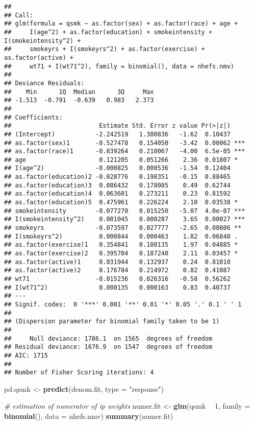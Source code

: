 \documentclass[10pt,]{book}
\newenvironment{Shaded}{\begin{snugshade}}{\end{snugshade}}
\newcommand{\CommentTok}[1]{\textcolor[rgb]{0.56,0.35,0.01}{\textit{#1}}}
\newcommand{\DataTypeTok}[1]{\textcolor[rgb]{0.13,0.29,0.53}{#1}}
\newcommand{\DecValTok}[1]{\textcolor[rgb]{0.00,0.00,0.81}{#1}}
\newcommand{\KeywordTok}[1]{\textcolor[rgb]{0.13,0.29,0.53}{\textbf{#1}}}
\newcommand{\NormalTok}[1]{#1}
\newcommand{\OperatorTok}[1]{\textcolor[rgb]{0.81,0.36,0.00}{\textbf{#1}}}
\newcommand{\StringTok}[1]{\textcolor[rgb]{0.31,0.60,0.02}{#1}}
\begin{document}
\begin{verbatim}
## 
## Call:
## glm(formula = qsmk ~ as.factor(sex) + as.factor(race) + age + 
##     I(age^2) + as.factor(education) + smokeintensity + I(smokeintensity^2) + 
##     smokeyrs + I(smokeyrs^2) + as.factor(exercise) + as.factor(active) + 
##     wt71 + I(wt71^2), family = binomial(), data = nhefs.nmv)
## 
## Deviance Residuals: 
##    Min      1Q  Median      3Q     Max  
## -1.513  -0.791  -0.639   0.983   2.373  
## 
## Coefficients:
##                        Estimate Std. Error z value Pr(>|z|)    
## (Intercept)           -2.242519   1.380836   -1.62  0.10437    
## as.factor(sex)1       -0.527478   0.154050   -3.42  0.00062 ***
## as.factor(race)1      -0.839264   0.210067   -4.00  6.5e-05 ***
## age                    0.121205   0.051266    2.36  0.01807 *  
## I(age^2)              -0.000825   0.000536   -1.54  0.12404    
## as.factor(education)2 -0.028776   0.198351   -0.15  0.88465    
## as.factor(education)3  0.086432   0.178085    0.49  0.62744    
## as.factor(education)4  0.063601   0.273211    0.23  0.81592    
## as.factor(education)5  0.475961   0.226224    2.10  0.03538 *  
## smokeintensity        -0.077270   0.015250   -5.07  4.0e-07 ***
## I(smokeintensity^2)    0.001045   0.000287    3.65  0.00027 ***
## smokeyrs              -0.073597   0.027777   -2.65  0.00806 ** 
## I(smokeyrs^2)          0.000844   0.000463    1.82  0.06840 .  
## as.factor(exercise)1   0.354841   0.180135    1.97  0.04885 *  
## as.factor(exercise)2   0.395704   0.187240    2.11  0.03457 *  
## as.factor(active)1     0.031944   0.132937    0.24  0.81010    
## as.factor(active)2     0.176784   0.214972    0.82  0.41087    
## wt71                  -0.015236   0.026316   -0.58  0.56262    
## I(wt71^2)              0.000135   0.000163    0.83  0.40737    
## ---
## Signif. codes:  0 '***' 0.001 '**' 0.01 '*' 0.05 '.' 0.1 ' ' 1
## 
## (Dispersion parameter for binomial family taken to be 1)
## 
##     Null deviance: 1786.1  on 1565  degrees of freedom
## Residual deviance: 1676.9  on 1547  degrees of freedom
## AIC: 1715
## 
## Number of Fisher Scoring iterations: 4
\end{verbatim}

\begin{Shaded}
\begin{Highlighting}[]
\NormalTok{pd.qsmk <-}\StringTok{ }\KeywordTok{predict}\NormalTok{(denom.fit, }\DataTypeTok{type =} \StringTok{"response"}\NormalTok{)}

\CommentTok{# estimation of numerator of ip weights}
\NormalTok{numer.fit <-}\StringTok{ }\KeywordTok{glm}\NormalTok{(qsmk }\OperatorTok{~}\StringTok{ }\DecValTok{1}\NormalTok{, }\DataTypeTok{family =} \KeywordTok{binomial}\NormalTok{(), }\DataTypeTok{data =}\NormalTok{ nhefs.nmv)}
\KeywordTok{summary}\NormalTok{(numer.fit)}
\end{Highlighting}
\end{Shaded}
\end{document}

